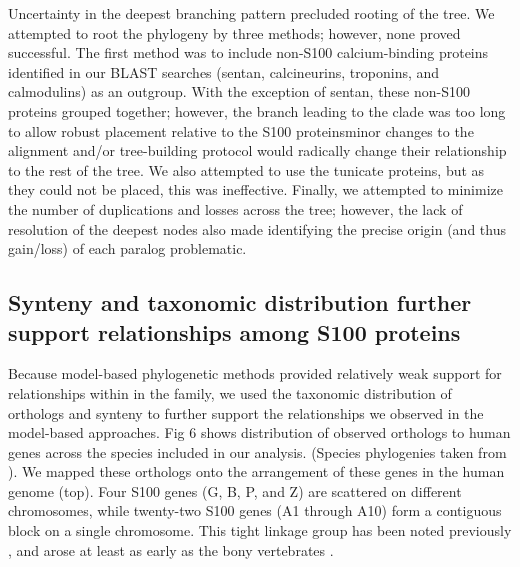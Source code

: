 Uncertainty in the deepest branching pattern precluded rooting of
the tree. We attempted to root the phylogeny by three methods; however,
none proved successful. The first method was to include non-S100 calcium-binding
proteins identified in our BLAST searches (sentan, calcineurins, troponins,
and calmodulins) as an outgroup. With the exception of sentan, these
non-S100 proteins grouped together; however, the branch leading to
the clade was too long to allow robust placement relative to the S100
proteins\textemdash minor changes to the alignment and/or tree-building
protocol would radically change their relationship to the rest of
the tree. We also attempted to use the tunicate proteins, but as they
could not be placed, this was ineffective. Finally, we attempted to
minimize the number of duplications and losses across the tree; however,
the lack of resolution of the deepest nodes also made identifying
the precise origin (and thus gain/loss) of each paralog problematic.

\subsection{Synteny and taxonomic distribution further support relationships among S100 proteins}

Because model-based phylogenetic methods provided relatively weak
support for relationships within in the family, we used the taxonomic
distribution of orthologs and synteny to further support the relationships
we observed in the model-based approaches. Fig 6 shows distribution
of observed orthologs to human genes across the species included in
our analysis. (Species phylogenies taken from \cite{alexander_pyron_large-scale_2011,chiari_phylogenomic_2012,faircloth_phylogenomic_2013,green_three_2014,satoh_chordate_2014,gallus_disentangling_2015,prum_comprehensive_2015,diaz-jaimes_complete_2016,tarver_interrelationships_2016}).
We mapped these orthologs onto the arrangement of these genes in the
human genome (top). Four S100 genes (G, B, P, and Z) are scattered
on different chromosomes, while twenty-two S100 genes (A1 through
A10) form a contiguous block on a single chromosome. This tight linkage
group has been noted previously \cite{marenholz_s100_2004,shang_chromosomal_2008,dorin_related_1990},
and arose at least as early as the bony vertebrates \cite{shang_chromosomal_2008}.

